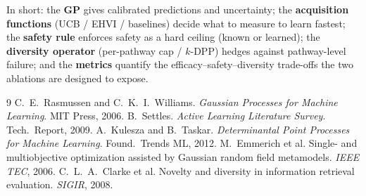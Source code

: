 \documentclass[11pt]{article}
\begin{document}
In short: the \textbf{GP} gives calibrated predictions and uncertainty; the
\textbf{acquisition functions} (UCB / EHVI / baselines) decide what to measure to learn
fastest; the \textbf{safety rule} enforces safety as a hard ceiling (known or learned); the
\textbf{diversity operator} (per-pathway cap / $k$-DPP) hedges against pathway-level
failure; and the \textbf{metrics} quantify the efficacy--safety--diversity trade-offs the
two ablations are designed to expose.

\begin{thebibliography}{9}
 C.~E.~Rasmussen and C.~K.~I.~Williams. \emph{Gaussian Processes for Machine Learning}. MIT Press, 2006.
 B.~Settles. \emph{Active Learning Literature Survey}. Tech.\ Report, 2009.
 A.~Kulesza and B.~Taskar. \emph{Determinantal Point Processes for Machine Learning}. Found.\ Trends ML, 2012.
 M.~Emmerich et al. Single- and multiobjective optimization assisted by Gaussian random field metamodels. \emph{IEEE TEC}, 2006.
 C.~L.~A.~Clarke et al. Novelty and diversity in information retrieval evaluation. \emph{SIGIR}, 2008.
\end{thebibliography}
\end{document}
